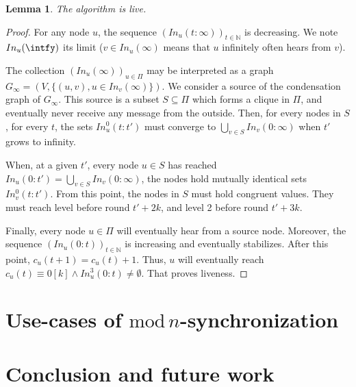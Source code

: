 \documentclass[11pt,letterpaper]{article}
\newtheorem{lem}[thm]{Lemma}
\begin{document}
\begin{lem}
	The  algorithm is live.
\end{lem}
\begin{proof}
	For any node $u$, the sequence $(In_u(t:\infty))_{t \in \mathds{N}}$ is decreasing.
	We note $In_u(\intfy)$ its limit ($v \in In_u(\infty)$ means that $u$ infinitely often hears from $v$).

	The collection $(In_u(\infty))_{u \in \Pi}$ may be interpreted as a graph $G_\infty = (V, \{(u,v), u \in In_v(\infty)\})$.
	We consider a source of the condensation graph of $G_\infty$.
	This source is a subset $S \subseteq \Pi$ which forms a clique in $\Pi$, and eventually never receive any message from the outside.
	Then, for every nodes in $S$, for every $t$, the sets $In_u^0(t:t')$ must converge to $\bigcup\limits_{v \in S} In_v(0:\infty)$ when $t'$ grows to infinity.

	When, at a given $t'$, every node $u \in S$ has reached $In_u(0:t') = \bigcup\limits_{v \in S} In_v(0:\infty)$, the nodes hold mutually identical sets $In_v^0(t:t')$.
	From this point, the nodes in $S$ must hold congruent values.
	They must reach level before round $t'+2k$, and level 2 before round $t'+3k$.

	Finally, every node $u \in \Pi$ will eventually hear from a source node.
	Moreover, the sequence $(In_u(0:t))_{t \in \mathds{N}}$ is increasing and eventually stabilizes.
	After this point, $c_u(t+1) = c_u(t)+1$.
	Thus, $u$ will eventually reach $c_u(t) \equiv 0 [k] \wedge In_u^3(0:t) \neq \emptyset$.
	That proves liveness.
\end{proof}

\section{Use-cases of $\mathrm{mod}\,n$-synchronization}

\section{Conclusion and future work}


\printbibliography
\end{document}
